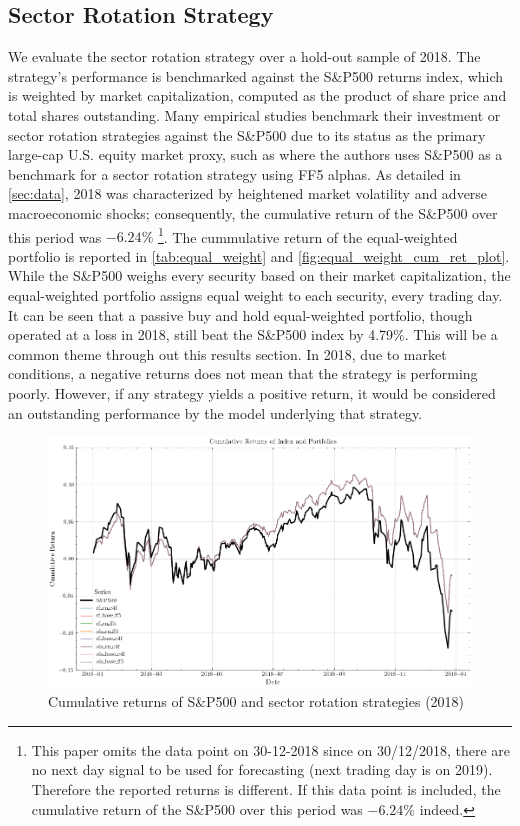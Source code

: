 \subsection{Sector Rotation Strategy}
We evaluate the sector rotation strategy over a hold-out sample of 2018. The strategy's performance is benchmarked against the S\&P500 returns index, which is weighted by market capitalization, computed as the product of share price and total shares outstanding. Many empirical studies benchmark their investment or sector rotation strategies against the S\&P500 due to its status as the primary large-cap U.S. equity market proxy, such as  where the authors uses S\&P500 as a benchmark for a sector rotation strategy using FF5 alphas. As detailed in \cref{sec:data}, 2018 was characterized by heightened market volatility and adverse macroeconomic shocks; consequently, the cumulative return of the S\&P500 over this period was $-6.24\%$ \footnote{This paper omits the data point on 30-12-2018 since on 30/12/2018, there are no next day signal to be used for forecasting (next trading day is on 2019). Therefore the reported returns is different. If this data point is included, the cumulative return of the S\&P500 over this period was $-6.24\%$ indeed.}. The cummulative return of the equal-weighted portfolio is reported in \cref{tab:equal_weight} and \cref{fig:equal_weight_cum_ret_plot}. While the S\&P500 weighs every security based on their market capitalization, the equal-weighted portfolio assigns equal weight to each security, every trading day. It can be seen that a passive buy and hold equal-weighted portfolio, though operated at a loss in 2018, still beat the S\&P500 index by 4.79\%. This will be a common theme through out this results section. In 2018, due to market conditions, a negative returns does not mean that the strategy is performing poorly. However, if any strategy yields a positive return, it would be considered an outstanding performance by the model underlying that strategy.

\begin{figure}[H]
    \centering
    \includegraphics[width=\textwidth]{plots/results/equal_w_cum_ret_plot.png}
    \caption{Cumulative returns of S\&P500 and sector rotation strategies (2018)}\label{fig:eq_w_cum_ret_plot}
\end{figure}


